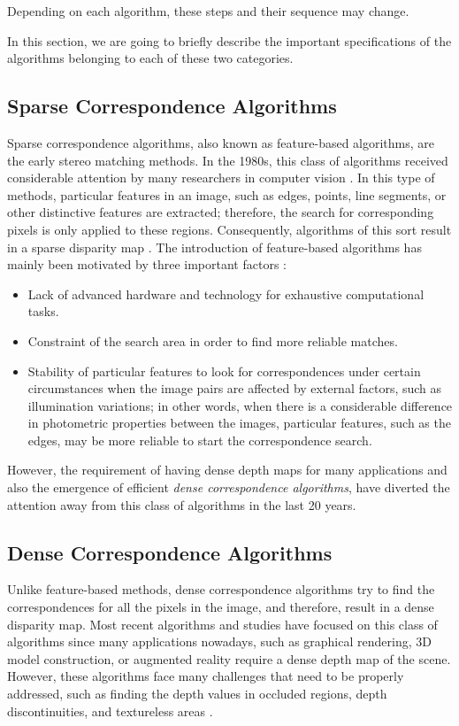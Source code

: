 Depending on each algorithm, these steps and their sequence may change.

In this section, we are going to briefly describe the important specifications of the algorithms belonging to each of these two categories.
\subsection{Sparse Correspondence Algorithms}
Sparse correspondence algorithms, also known as feature-based algorithms, are the early stereo matching methods. In the 1980s, this class of algorithms received considerable attention by
many researchers in computer vision \cite{dhon89}.
In this type of methods, particular features in an image, such as edges, 
points, line segments, or other distinctive features are extracted; therefore, the search for corresponding pixels is only applied to these regions. 
Consequently, algorithms of this
sort result in a sparse disparity map \cite{matt89,hsie92, sze11}. The introduction of feature-based algorithms has mainly been motivated by three important factors \cite{bro03,sze11}:
\begin{itemize}
\item Lack of advanced hardware and technology for exhaustive computational tasks.
\item Constraint of the search area in order to find more reliable matches.
\item Stability of particular features to look for correspondences under certain circumstances when the image pairs are affected by external factors, 
such as illumination variations; in other words, when there is a considerable difference in photometric properties between the images, 
particular features, such as the edges, may be more reliable to start the correspondence search.
\end{itemize}

However, the requirement of having dense depth maps for many applications and also the emergence of efficient {\it dense correspondence algorithms}, have diverted the attention away
from this class of algorithms in the last 20 years.

\subsection{Dense Correspondence Algorithms}
Unlike feature-based methods, dense correspondence algorithms try to find the
correspondences for all the pixels in the image, and therefore, result in a dense disparity map. Most recent algorithms and studies have focused on this class of algorithms since many applications 
nowadays, such as graphical rendering, 3D model construction, or augmented reality require a dense depth map of the scene. 
However, these algorithms face many challenges that need to be properly
addressed, such as finding the depth values in occluded regions, depth discontinuities, and textureless areas \cite{sch02,bro03}.

